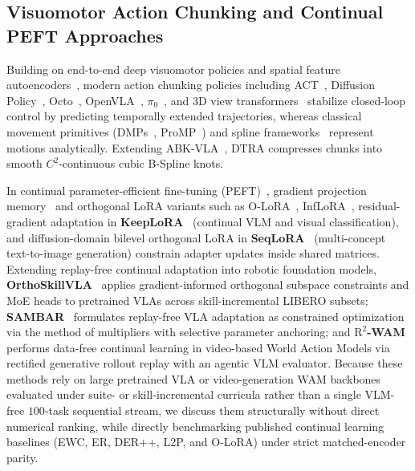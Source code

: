 \documentclass[10pt]{article}
\begin{document}
\subsection{Visuomotor Action Chunking and Continual PEFT Approaches}
Building on end-to-end deep visuomotor policies and spatial feature autoencoders~\cite{levine2016end,finn2016deep}, modern action chunking policies including ACT~\cite{zhao2023act}, Diffusion Policy~\cite{chi2023diffusion}, Octo~\cite{octo2024}, OpenVLA~\cite{kim2024openvla}, $\pi_0$~\cite{black2024pi0}, and 3D view transformers~\cite{shridhar2022peract,goyal2023rvt} stabilize closed-loop control by predicting temporally extended trajectories, whereas classical movement primitives (DMPs~\cite{ijspeert2013dmp}, ProMP~\cite{paraschos2013promp}) and spline frameworks~\cite{piegl1997nurbs,deboor1978splines} represent motions analytically. Extending ABK-VLA~\cite{son2026abkvla}, DTRA compresses chunks into smooth $C^2$-continuous cubic B-Spline knots.

In continual parameter-efficient fine-tuning (PEFT)~\cite{hu2022lora}, gradient projection memory~\cite{saha2021gpm} and orthogonal LoRA variants such as O-LoRA~\cite{wang2023olora}, InfLoRA~\cite{liang2024inflora}, residual-gradient adaptation in \textbf{KeepLoRA}~\cite{luo2026keeplora} (continual VLM and visual classification), and diffusion-domain bilevel orthogonal LoRA in \textbf{SeqLoRA}~\cite{parsa2026seqlora} (multi-concept text-to-image generation) constrain adapter updates inside shared matrices. Extending replay-free continual adaptation into robotic foundation models, \textbf{OrthoSkillVLA}~\cite{wang2026orthoskill} applies gradient-informed orthogonal subspace constraints and MoE heads to pretrained VLAs across skill-incremental LIBERO subsets; \textbf{SAMBAR}~\cite{shrivastava2026sambar} formulates replay-free VLA adaptation as constrained optimization via the method of multipliers with selective parameter anchoring; and \textbf{$\text{R}^2$-WAM}~\cite{fang2026r2wam} performs data-free continual learning in video-based World Action Models via rectified generative rollout replay with an agentic VLM evaluator. Because these methods rely on large pretrained VLA or video-generation WAM backbones evaluated under suite- or skill-incremental curricula rather than a single VLM-free $100$-task sequential stream, we discuss them structurally without direct numerical ranking, while directly benchmarking published continual learning baselines (EWC, ER, DER++, L2P, and O-LoRA) under strict matched-encoder parity.
\end{document}
